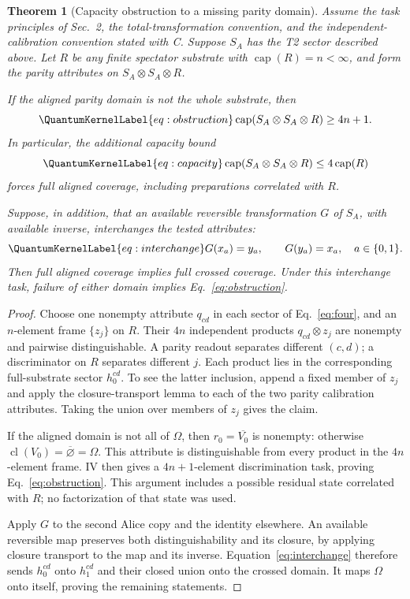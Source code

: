 \documentclass[a4paper,11pt,twocolumn,unpublished]{quantumarticle}
\let\label\QuantumKernelLabel
\newtheorem{theorem}{Theorem}
\DeclareMathOperator{\cl}{cl}
\DeclareMathOperator{\capn}{cap}
\begin{document}
\begin{theorem}[Capacity obstruction to a missing parity domain]\label{thm:capacity}
Assume the task principles of Sec.~2, the total-transformation convention, and the independent-calibration convention stated with C. Suppose $S_A$ has the T2 sector described above. Let $R$ be any finite spectator substrate with $\capn(R)=n<\infty$, and form the parity attributes on $S_A\otimes S_A\otimes R$.

If the aligned parity domain is not the whole substrate, then
\begin{equation}\label{eq:obstruction}
 \capn(S_A\otimes S_A\otimes R)\geq4n+1.
\end{equation}
In particular, the additional capacity bound
\begin{equation}\label{eq:capacity}
 \capn(S_A\otimes S_A\otimes R)\leq4\capn(R)
\end{equation}
forces full aligned coverage, including preparations correlated with $R$.

Suppose, in addition, that an available reversible transformation $G$ of $S_A$, with available inverse, interchanges the tested attributes:
\begin{equation}\label{eq:interchange}
 G(x_a)=y_a,\qquad G(y_a)=x_a,\quad a\in\{0,1\}.
\end{equation}
Then full aligned coverage implies full crossed coverage. Under this interchange task, failure of either domain implies Eq.~\eqref{eq:obstruction}.
\end{theorem}
\begin{proof}
Choose one nonempty attribute $q_{cd}$ in each sector of Eq.~\eqref{eq:four}, and an $n$-element frame $\{z_j\}$ on $R$. Their $4n$ independent products $q_{cd}\otimes z_j$ are nonempty and pairwise distinguishable. A parity readout separates different $(c,d)$; a discriminator on $R$ separates different $j$. Each product lies in the corresponding full-substrate sector $h^{cd}_0$. To see the latter inclusion, append a fixed member of $z_j$ and apply the closure-transport lemma to each of the two parity calibration attributes. Taking the union over members of $z_j$ gives the claim.

If the aligned domain is not all of $\Omega$, then $r_0=\overline{V_0}$ is nonempty: otherwise $\cl(V_0)=\overline\varnothing=\Omega$. This attribute is distinguishable from every product in the $4n$-element frame. IV then gives a $4n+1$-element discrimination task, proving Eq.~\eqref{eq:obstruction}. This argument includes a possible residual state correlated with $R$; no factorization of that state was used.

Apply $G$ to the second Alice copy and the identity elsewhere. An available reversible map preserves both distinguishability and its closure, by applying closure transport to the map and its inverse. Equation~\eqref{eq:interchange} therefore sends $h^{cd}_0$ onto $h^{cd}_1$ and their closed union onto the crossed domain. It maps $\Omega$ onto itself, proving the remaining statements.
\end{proof}
\end{document}
